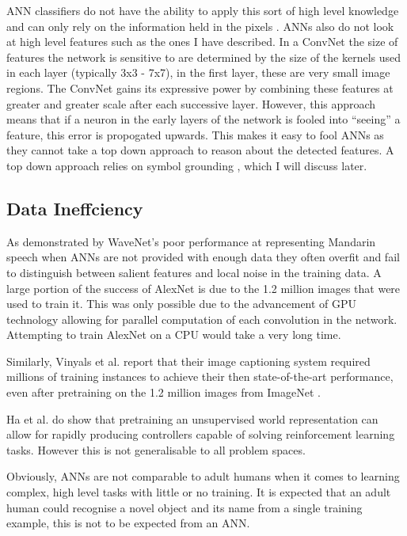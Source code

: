 \ac{ANN} classifiers do not have the ability to apply this sort of high level knowledge and can only rely on the information held in the pixels . \acp{ANN} also do not look at high level features such as the ones I have described. In a \ac{ConvNet} the size of features the network is sensitive to are determined by the size of the kernels used in each layer (typically 3x3 - 7x7), in the first layer, these are very small image regions. The \ac{ConvNet} gains its expressive power by combining these features at greater and greater scale after each successive layer. However, this approach means that if a neuron in the early layers of the network is fooled into ``seeing'' a feature, this error is propogated upwards. This makes it easy to fool \acp{ANN} as they cannot take a top down approach to reason about the detected features. A top down approach relies on symbol grounding \cite{barsalou2008grounded}, which I will discuss later.



\subsection{Data Ineffciency}
As demonstrated by WaveNet's poor performance at representing Mandarin speech \cite{wavenet} when \acp{ANN} are not provided with enough data they often overfit and fail to distinguish between salient features and local noise in the training data. A large portion of the success of AlexNet \cite{krizhevsky2012imagenet} is due to the 1.2 million images that were used to train it. This was only possible due to the advancement of \ac{GPU} technology allowing for parallel computation of each convolution in the network. Attempting to train AlexNet on a \ac{CPU} would take a very long time.

Similarly, Vinyals et al. \cite{vinyals2015show} report that their image captioning system required millions of training instances to achieve their then state-of-the-art performance, even after pretraining on the 1.2 million images from ImageNet \cite{ImNet}.

Ha et al. \cite{ha2018world, ha2018recurrent} do show that pretraining an unsupervised world representation can allow for rapidly producing controllers capable of solving reinforcement learning tasks. However this is not generalisable to all problem spaces.

Obviously, \acp{ANN} are not comparable to adult humans when it comes to learning complex, high level tasks with little or no training. It is expected that an adult human could recognise a novel object and its name from a single training example, this is not to be expected from an \ac{ANN}.

